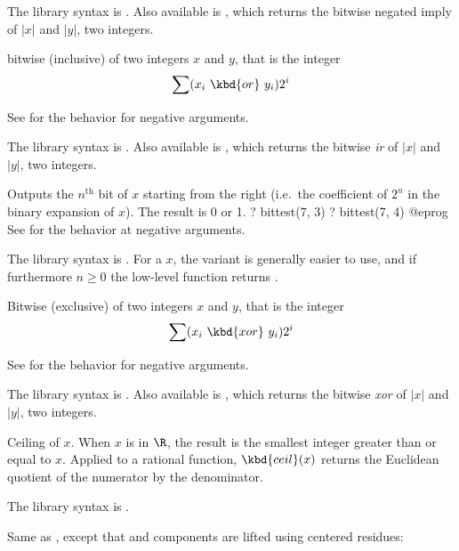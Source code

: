 The library syntax is .
Also available is
, which returns the bitwise negated
imply of $|x|$ and $|y|$, two integers.

\label{se:bitor}
bitwise (inclusive)
 of two integers $x$ and $y$, that is the integer $$\sum
(x_i~\kbd{or}~y_i) 2^i$$

See  for the behavior for negative arguments.

The library syntax is .
Also available is
, which returns the bitwise \emph{ir}
of $|x|$ and $|y|$, two integers.

\label{se:bittest}
Outputs the $n^{\text{th}}$ bit of $x$ starting
from the right (i.e.~the coefficient of $2^n$ in the binary expansion of $x$).
The result is 0 or 1.
\bprog
? bittest(7, 3)
? bittest(7, 4)
@eprog\noindent
See  for the behavior at negative arguments.

The library syntax is .
For a  $x$, the variant  is
generally easier to use, and if furthermore $n\ge 0$ the low-level function
 returns .

\label{se:bitxor}
Bitwise (exclusive) 
of two integers $x$ and $y$, that is the integer
$$\sum (x_i~\kbd{xor}~y_i) 2^i$$

See  for the behavior for negative arguments.

The library syntax is .
Also available is
, which returns the bitwise \emph{xor}
of $|x|$ and $|y|$, two integers.

\label{se:ceil}
Ceiling of $x$. When $x$ is in $\R$, the result is the
smallest integer greater than or equal to $x$. Applied to a rational
function, $\kbd{ceil}(x)$ returns the Euclidean quotient of the numerator by
the denominator.

The library syntax is .

\label{se:centerlift}
Same as , except that  and  components
are lifted using centered residues:

